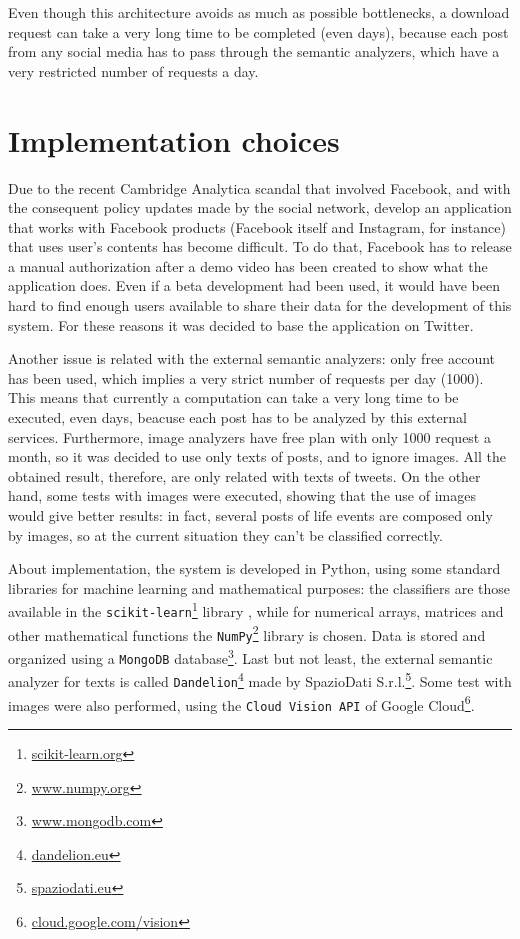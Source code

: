Even though this architecture avoids as much as possible bottlenecks, a download request can take a very long time to be completed (even days), because each post from any social media has to pass through the semantic analyzers, which have a very restricted number of requests a day.

\section{Implementation choices}
Due to the recent Cambridge Analytica scandal that involved Facebook, and with the consequent policy updates made by the social network, develop an application that works with Facebook products (Facebook itself and Instagram, for instance) that uses user's contents has become difficult. To do that, Facebook has to release a manual authorization after a demo video has been created to show what the application does. Even if a beta development had been used, it would have been hard to find enough users available to share their data for the development of this system. For these reasons it was decided to base the application on Twitter.

Another issue is related with the external semantic analyzers: only free account has been used, which implies a very strict number of requests per day (1000). This means that currently a computation can take a very long time to be executed, even days, beacuse each post has to be analyzed by this external services. Furthermore, image analyzers have free plan with only 1000 request a month, so it was decided to use only texts of posts, and to ignore images. All the obtained result, therefore, are only related with texts of tweets. On the other hand, some tests with images were executed, showing that the use of images would give better results: in fact, several posts of life events are composed only by images, so at the current situation they can't be classified correctly.

About implementation, the system is developed in Python, using some standard libraries for machine learning and mathematical purposes: the classifiers  
are those available in the \texttt{scikit-learn}\footnote{\url{scikit-learn.org}} library \cite{scikit-learn}, while for numerical arrays, matrices and other mathematical functions the \texttt{NumPy}\footnote{\url{www.numpy.org}} library \cite{oliphant2006guide} is chosen. Data is stored and organized using a \texttt{MongoDB} database\footnote{\url{www.mongodb.com}}. Last but not least, the external semantic analyzer for texts is called \texttt{Dandelion}\footnote{\url{dandelion.eu}} made by SpazioDati S.r.l.\footnote{\url{spaziodati.eu}}. Some test with images were also performed, using the \texttt{Cloud Vision API} of Google Cloud\footnote{\url{cloud.google.com/vision}}.

